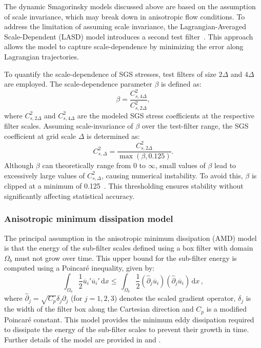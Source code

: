 \documentclass[final,3p]{elsarticle}
\begin{document}
The dynamic Smagorinsky models discussed above are based on the assumption of scale invariance, which may break down in anisotropic flow conditions. To address the limitation of assuming scale invariance, the Lagrangian-Averaged Scale-Dependent (LASD) model introduces a second test filter~\cite{bou2005scale}. This approach allows the model to capture scale-dependence by minimizing the error along Lagrangian trajectories.

To quantify the scale-dependence of SGS stresses, test filters of size \(2\Delta\) and \(4\Delta\) are employed. The scale-dependence parameter \(\beta\) is defined as:
\begin{equation}
	\beta = \frac{C^2_{s,4\Delta}}{C^2_{s,2\Delta}},
\end{equation}
where \(C^2_{s,2\Delta}\) and \(C^2_{s,4\Delta}\) are the modeled SGS stress coefficients at the respective filter scales. Assuming scale-invariance of \(\beta\) over the test-filter range, the SGS coefficient at grid scale \(\Delta\) is determined as:
\begin{equation}
	C^2_{s,\Delta} = \frac{C^2_{s,2\Delta}}{\max(\beta, 0.125)}.
\end{equation}
Although \(\beta\) can theoretically range from 0 to \(\infty\), small values of \(\beta\) lead to excessively large values of \(C^2_{s,\Delta}\), causing numerical instability. To avoid this, \(\beta\) is clipped at a minimum of 0.125~\cite{bou2005scale,stoll2008large}. This thresholding ensures stability without significantly affecting statistical accuracy.

\subsubsection{Anisotropic minimum dissipation model}
The principal assumption in the anisotropic minimum dissipation (AMD) model is that the energy of the sub-filter scales defined using a box filter with domain $\Omega_b$ must not grow over time. This upper bound for the sub-filter energy is computed using a Poincar\'e inequality, given by:
\begin{equation}
	\int_{\Omega_b} \frac{1}{2} \overline{u}_i' \overline{u}_i' \, \mathrm{d}x \leq \,  \int_{\Omega_b} \frac{1}{2} (\hat{\partial}_j \overline{u}_i)(\hat{\partial}_j \overline{u}_i) \, \mathrm{d}x \, ,
\end{equation}
where $\hat{\partial}_j = \sqrt{C_p} \delta_j \partial_j$ (for $j = 1, 2, 3$) denotes the scaled gradient operator, $\delta_j$ is the width of the filter box along the Cartesian direction and $C_p$ is a modified Poincar\'e constant. This model provides the minimum eddy dissipation required to dissipate the energy of the sub-filter scales to prevent their growth in time. Further details of the model are provided in \citet{rozema2015minimum} and \citet{abkar2016minimum}.
\end{document}
